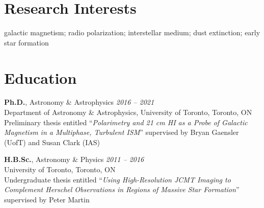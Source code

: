 \documentclass[10pt]{res} %
\begin{document}
\begin{resume}


\section{\Large Research Interests}
\vspace{-5pt} %
\noindent\makebox[\linewidth]{\rule{\textwidth}{0.4pt}}
\vspace{-20pt} %

galactic magnetism; radio polarization; interstellar medium; dust extinction; early star formation


\section{\Large Education}
\vspace{-5pt} %
\noindent\makebox[\linewidth]{\rule{\textwidth}{0.4pt}}
\vspace{-20pt} %

{\bf Ph.D.}, Astronomy \& Astrophysics \hfill \textit{2016 -- 2021} \\
Department of Astronomy \& Astrophysics, University of Toronto, Toronto, ON \\
Preliminary thesis entitled ``\textit{Polarimetry and 21 cm HI as a Probe of Galactic Magnetism in a Multiphase, Turbulent ISM}'' supervised by Bryan Gaensler (UofT) and Susan Clark (IAS)

{\bf H.B.Sc.}, Astronomy \& Physics \hfill \textit{2011 -- 2016} \\ 
University of Toronto, Toronto, ON \\ 
Undergraduate thesis entitled ``\textit{Using High-Resolution JCMT Imaging to Complement Herschel Observations in Regions of Massive Star Formation}'' supervised by Peter Martin
 


\end{resume}
\end{document}
